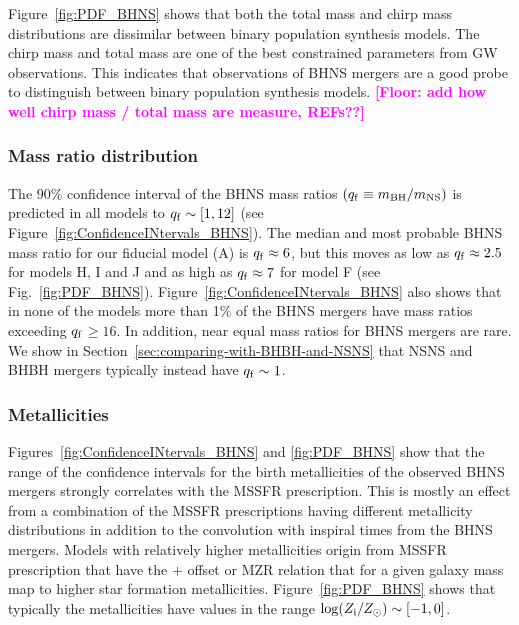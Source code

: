 \documentclass[twocolumn]{aastex63}
\newcommand{\floor}[1]{\textbf{\textcolor{magenta}{[Floor: #1]}}}
\newcommand\bhnsSingle{BHNS\xspace}
\newcommand{\Zi}{\ensuremath{Z_{\rm{i}}}\xspace}
\newcommand{\Msun}{\ensuremath{\,\rm{M}_{\odot}}\xspace}
\newcommand{\mnsf}{\ensuremath{m_{\rm{NS}}}\xspace}
\newcommand{\mbhf}{\ensuremath{m_{\rm{BH}}}\xspace}
\newcommand{\qf}{\ensuremath{q_{\rm{f}}}\xspace}
\begin{document}
Figure~\ref{fig:PDF_BHNS} shows that both the total mass and chirp mass distributions are dissimilar between binary population synthesis models. The chirp mass and total mass  are one of the best constrained parameters from \ac{GW} observations.  This indicates that observations of \bhnsSingle mergers  are a good probe to distinguish between binary population synthesis models.  \floor{add how well chirp mass / total mass are measure, REFs??}


\subsubsection{Mass ratio distribution}
The $90\%$ confidence interval of the \bhnsSingle mass ratios $ (\qf \equiv \mbhf / \mnsf)$   is predicted in all models to  $\qf \sim [1, 12]$ (see  Figure~\ref{fig:ConfidenceINtervals_BHNS}). The median and most probable \bhnsSingle mass ratio for our fiducial model (A) is $\qf \approx 6$, but this moves as low as  $\qf \approx 2.5$ for models H, I and J   and as high as $\qf \approx 7$ for model F (see Fig.~\ref{fig:PDF_BHNS}).  Figure~\ref{fig:ConfidenceINtervals_BHNS} also shows  that in none of the models more than 1$\%$ of the \bhnsSingle mergers have mass ratios exceeding \qf $\geq 16$.  In addition, near equal mass ratios for \bhnsSingle mergers are rare.  We show in Section~\ref{sec:comparing-with-BHBH-and-NSNS} that  \ac{NSNS} and \ac{BHBH} mergers typically instead have $\qf \sim 1$. 


\subsubsection{Metallicities}
Figures~\ref{fig:ConfidenceINtervals_BHNS} and \ref{fig:PDF_BHNS} show that the range of the confidence intervals for the birth metallicities of the observed \bhnsSingle mergers strongly correlates with the \ac{MSSFR} prescription. This is mostly an effect from a combination of the \ac{MSSFR} prescriptions having different metallicity distributions in addition to the convolution with inspiral times from the \bhnsSingle mergers. Models with relatively higher metallicities origin from \ac{MSSFR} prescription that have the  \citet{2006ApJ...638L..63L} $+$ offset or \citet{2016MNRAS.456.2140M}  \ac{MZR} relation that for a given galaxy mass map to higher star formation metallicities.  
Figure~\ref{fig:PDF_BHNS} shows that typically the metallicities have values in the range $\log(\Zi/Z_{\odot}) \sim [-1, 0]$.
\end{document}
